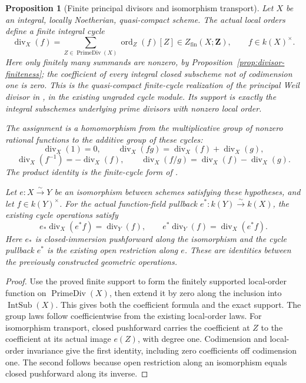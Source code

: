 \documentclass[11pt]{article}
\newtheorem{proposition}[theorem]{Proposition}
\theoremstyle{definition}
\theoremstyle{remark}
\begin{document}
\begin{proposition}[Finite principal divisors and isomorphism transport]
\label{prop:principal-divisor}
Let \(X\) be an integral, locally Noetherian, quasi-compact scheme.
The actual local orders define a finite integral cycle
\[
  \operatorname{div}_X(f)
    =\sum_{Z\in\operatorname{PrimeDiv}(X)}
        \operatorname{ord}_Z(f)[Z]
    \in Z_{\mathrm{fin}}(X;\mathbf Z),
  \qquad f\in k(X)^\times.
\]
Here only finitely many summands are nonzero, by
Proposition~\ref{prop:divisor-finiteness}; the coefficient of every
integral closed subscheme not of codimension one is zero. This is the
quasi-compact finite-cycle realization of the principal Weil divisor
in \cite{StacksPrincipalWeilDivisor}, in the existing ungraded cycle module.
Its support is exactly the integral subschemes underlying prime divisors
with nonzero local order.

The assignment is a homomorphism from the multiplicative group of
nonzero rational functions to the additive group of these cycles:
\[
  \operatorname{div}_X(1)=0,\qquad
  \operatorname{div}_X(fg)
    =\operatorname{div}_X(f)+\operatorname{div}_X(g),
\]
\[
  \operatorname{div}_X(f^{-1})=-\operatorname{div}_X(f),\qquad
  \operatorname{div}_X(f/g)
    =\operatorname{div}_X(f)-\operatorname{div}_X(g).
\]
The product identity is the finite-cycle form of
\cite{StacksPrincipalWeilDivisorProduct}.

Let \(e:X\xrightarrow{\sim}Y\) be an isomorphism between schemes
satisfying these hypotheses, and let \(f\in k(Y)^\times\).
For the actual function-field pullback
\(e^*:k(Y)\xrightarrow{\sim}k(X)\), the existing cycle operations satisfy
\[
  e_*\operatorname{div}_X(e^*f)=\operatorname{div}_Y(f),
  \qquad
  e^*\operatorname{div}_Y(f)=\operatorname{div}_X(e^*f).
\]
Here \(e_*\) is closed-immersion pushforward along the isomorphism and
the cycle pullback \(e^*\) is the existing open restriction along \(e\).
These are identities between the previously constructed geometric operations.
\end{proposition}

\begin{proof}
Use the proved finite support to form the finitely supported local-order
function on \(\operatorname{PrimeDiv}(X)\), then extend it by zero along
the inclusion into \(\operatorname{IntSub}(X)\). This gives both the
coefficient formula and the exact support. The group laws follow
coefficientwise from the existing local-order laws.
For isomorphism transport, closed pushforward carries the coefficient
at \(Z\) to the coefficient at its actual image \(e(Z)\), with degree one.
Codimension and local-order invariance give the first identity, including
zero coefficients off codimension one. The second follows because open
restriction along an isomorphism equals closed pushforward along its inverse.
\end{proof}
\end{document}
